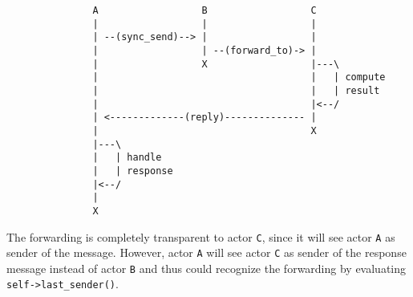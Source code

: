 \begin{footnotesize}
\begin{verbatim}
               A                  B                  C
               |                  |                  |
               | --(sync_send)--> |                  |
               |                  | --(forward_to)-> |
               |                  X                  |---\
               |                                     |   | compute
               |                                     |   | result
               |                                     |<--/
               | <-------------(reply)-------------- |
               |                                     X
               |---\
               |   | handle
               |   | response
               |<--/
               |
               X
\end{verbatim}
\end{footnotesize}

The forwarding is completely transparent to actor \texttt{C}, since it will see actor \texttt{A} as sender of the message.
However, actor \texttt{A} will see actor \texttt{C} as sender of the response message instead of actor \texttt{B} and thus could recognize the forwarding by evaluating \lstinline^self->last_sender()^.